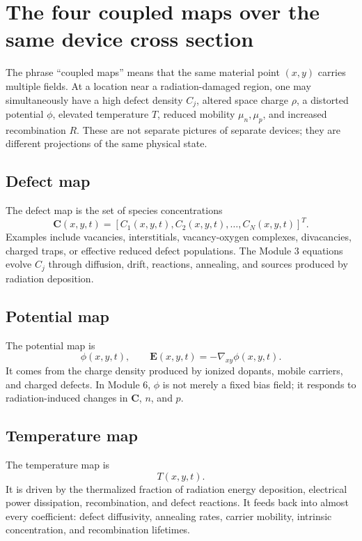 \documentclass[11pt]{article}
\newcommand{\Evec}{\bm{E}}
\newcommand{\Cvec}{\bm{C}}
\newcommand{\gradxy}{\nabla_{xy}}
\begin{document}
\section{The four coupled maps over the same device cross section}

The phrase ``coupled maps'' means that the same material point \((x,y)\) carries multiple fields. At a location near a radiation-damaged region, one may simultaneously have a high defect density \(C_j\), altered space charge \(\rho\), a distorted potential \(\phi\), elevated temperature \(T\), reduced mobility \(\mu_n,\mu_p\), and increased recombination \(R\). These are not separate pictures of separate devices; they are different projections of the same physical state.

\subsection{Defect map}

The defect map is the set of species concentrations
\begin{equation}
\Cvec(x,y,t)=\left[C_1(x,y,t),C_2(x,y,t),\ldots,C_N(x,y,t)\right]^T.
\end{equation}
Examples include vacancies, interstitials, vacancy-oxygen complexes, divacancies, charged traps, or effective reduced defect populations. The Module 3 equations evolve \(C_j\) through diffusion, drift, reactions, annealing, and sources produced by radiation deposition.

\subsection{Potential map}

The potential map is
\begin{equation}
\phi(x,y,t), \qquad \Evec(x,y,t)=-\gradxy\phi(x,y,t).
\end{equation}
It comes from the charge density produced by ionized dopants, mobile carriers, and charged defects. In Module 6, \(\phi\) is not merely a fixed bias field; it responds to radiation-induced changes in \(\Cvec\), \(n\), and \(p\).

\subsection{Temperature map}

The temperature map is
\begin{equation}
T(x,y,t).
\end{equation}
It is driven by the thermalized fraction of radiation energy deposition, electrical power dissipation, recombination, and defect reactions. It feeds back into almost every coefficient: defect diffusivity, annealing rates, carrier mobility, intrinsic concentration, and recombination lifetimes.
\end{document}
